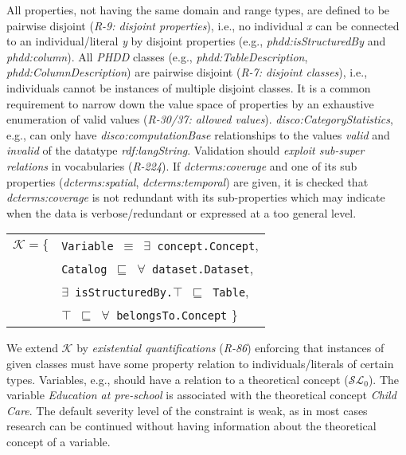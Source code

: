\documentclass{llncs}
\newcommand{\ms}[1]{\texttt{#1}}
\newenvironment{DL}{
  \small
  \vspace{0cm}
	\begin{center}
  \begin{tabular}{c l}

}{
  \end{tabular}
	\end{center}
}
\begin{document}
{{All properties, not having the same domain and range types, are defined to be pairwise disjoint
(\emph{R-9: disjoint properties}), i.e., no individual \emph{x} can be connected to an individual/literal \emph{y} by disjoint properties (e.g., \emph{phdd:isStructuredBy} and \emph{phdd:column}).
All \emph{PHDD} classes (e.g., \emph{phdd:TableDescription}, \emph{phdd:ColumnDescription}) are pairwise disjoint (\emph{R-7: disjoint classes}),
i.e., individuals cannot be instances of multiple disjoint classes.
It is a common requirement to narrow down the value space of properties by an exhaustive enumeration of valid values (\emph{R-30/37: allowed values}). 
\emph{disco:CategoryStatistics}, e.g., can only have \emph{disco:computationBase} relationships to the values \emph{valid} and \emph{invalid} of the datatype \emph{rdf:langString}.
Validation should \emph{exploit sub-super relations} in vocabularies (\emph{R-224}).
If \emph{dcterms:coverage} and one of its sub properties (\emph{dcterms:spatial}, \emph{dcterms:temporal}) are given,
it is checked that \emph{dcterms:coverage} is not redundant with its sub-properties 
which may indicate when the data is verbose/redundant or expressed at a too general level.

\begin{center}
\begin{DL} 
$\mathcal{K}=\{$ &\ms{Variable $\equiv$ $\exists$ concept.Concept}, \\
&\ms{Catalog $\sqsubseteq$ $\forall$ dataset.Dataset}, \\
&\ms{$\exists$ isStructuredBy.$\top$ $\sqsubseteq$ Table}, \\
&\ms{$\top$ $\sqsubseteq$ $\forall$ belongsTo.Concept}
\}\\ 
\end{DL}
\end{center}

We extend $\mathcal{K}$ by \emph{existential quantifications} (\emph{R-86}) enforcing that instances of given classes must have some property relation to individuals/literals of certain types.
Variables, e.g., should have a relation to a theoretical concept ($\mathcal{SL}_{0}$).
The variable \emph{Education at pre-school} is associated with the theoretical concept \emph{Child Care}. 
The default severity level of the constraint is weak, as in most cases research can be continued without having information about the theoretical concept of a variable.

}}
\end{document}
